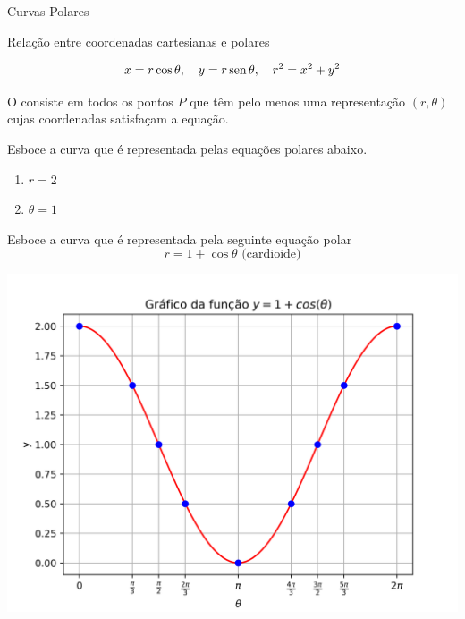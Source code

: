 \begin{frame}[label=fun-vet]{Curvas Polares}
\begin{block}{Relação entre coordenadas cartesianas e polares}

$$x=r\cos \theta, \ \ \ y=r\sen \theta, \ \ \ r^2=x^2+y^2$$
\end{block}

O  consiste em todos os pontos $P$ que têm pelo menos uma representação $(r,\theta)$ cujas coordenadas satisfaçam a equação. 

\begin{exe} Esboce a curva que é representada pelas equações polares abaixo.
		\begin{enumerate}[a]
		\item $r=2$
		
		\item $\theta=1$
		

			\end{enumerate}
\end{exe}

\end{frame}

\begin{frame}[label=fun-vet]
\begin{exe} Esboce a curva que é representada pela seguinte equação polar
\[r=1+\cos\theta \text{ (cardioide)}\]
\end{exe}


\begin{center}
\includegraphics[scale=0.5]{figuras/grafico-aux-cardioide.png}
\end{center}
\end{frame}

